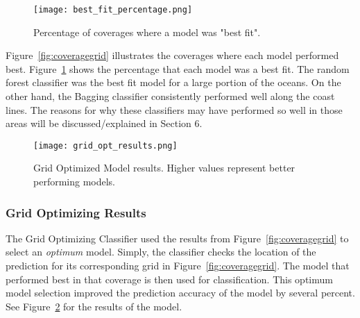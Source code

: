 \begin{figure}[htp]
    \centering
    \texttt{[image: best\_fit\_percentage.png]}
    \caption{Percentage of coverages where a model was "best fit".}
    \label{fig:pie_best_fit}
\end{figure}

\par
Figure~\ref{fig:coveragegrid} illustrates the coverages where each model performed best.
Figure~\ref{fig:pie_best_fit} shows the percentage that each model was a best fit.
The random forest classifier was the best fit model for a large portion of the oceans.
On the other hand, the Bagging classifier consistently performed well along the coast lines.
The reasons for why these classifiers may have performed so well in those areas will be discussed/explained in Section 6.


\begin{figure}[htp]
    \centering
    \texttt{[image: grid\_opt\_results.png]}
    \caption{Grid Optimized Model results. Higher values represent better performing models.}
    \label{fig:grid_opt_barplot}
\end{figure}
\subsubsection{Grid Optimizing Results}
The Grid Optimizing Classifier used the results from Figure~\ref{fig:coveragegrid} to select an \textit{optimum} model.
Simply, the classifier checks the location of the prediction for its corresponding grid in Figure~\ref{fig:coveragegrid}.
The model that performed best in that coverage is then used for classification.
This optimum model selection improved the prediction accuracy of the model by several percent.
See Figure~\ref{fig:grid_opt_barplot} for the results of the model.


